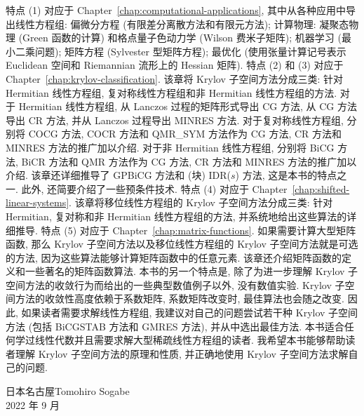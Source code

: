 {特点 (1) 对应于 Chapter~\ref{chap:computational-applications}, 其中从各种应用中导出线性方程组: 偏微分方程 (有限差分离散方法和有限元方法); 计算物理: 凝聚态物理 (Green 函数的计算) 和格点量子色动力学 (Wilson 费米子矩阵); 机器学习 (最小二乘问题); 矩阵方程 (Sylvester 型矩阵方程); 最优化 (使用张量计算记号表示 Euclidean 空间和 Riemannian 流形上的 Hessian 矩阵).}
{特点 (2) 和 (3) 对应于 Chapter~\ref{chap:krylov-classification}. 该章将 Krylov 子空间方法分成三类: 针对 Hermitian 线性方程组, 复对称线性方程组和非 Hermitian 线性方程组的方法. 对于 Hermitian 线性方程组, 从 Lanczos 过程的矩阵形式导出 CG 方法, 从 CG 方法导出 CR 方法, 并从 Lanczos 过程导出 MINRES 方法. 对于复对称线性方程组, 分别将 COCG 方法, COCR 方法和 QMR\_SYM 方法作为 CG 方法, CR 方法和 MINRES 方法的推广加以介绍. 对于非 Hermitian 线性方程组, 分别将 BiCG 方法, BiCR 方法和 QMR 方法作为 CG 方法, CR 方法和 MINRES 方法的推广加以介绍. 该章还详细推导了 GPBiCG 方法和 (块) IDR($s$) 方法, 这是本书的特点之一. 此外, 还简要介绍了一些预条件技术.}
{特点 (4) 对应于 Chapter~\ref{chap:shifted-linear-systems}. 该章将移位线性方程组的 Krylov 子空间方法分成三类: 针对 Hermitian, 复对称和非 Hermitian 线性方程组的方法, 并系统地给出这些算法的详细推导.}
{特点 (5) 对应于 Chapter~\ref{chap:matrix-functions}. 如果需要计算大型矩阵函数, 那么 Krylov 子空间方法以及移位线性方程组的 Krylov 子空间方法就是可选的方法, 因为这些算法能够计算矩阵函数中的任意元素. 该章还介绍矩阵函数的定义和一些著名的矩阵函数算法.}
{本书的另一个特点是, 除了为进一步理解 Krylov 子空间方法的收敛行为而给出的一些典型数值例子以外, 没有数值实验. Krylov 子空间方法的收敛性高度依赖于系数矩阵, 系数矩阵改变时, 最佳算法也会随之改变. 因此, 如果读者需要求解线性方程组, 我建议对自己的问题尝试若干种 Krylov 子空间方法 (包括 BiCGSTAB 方法和 GMRES 方法), 并从中选出最佳方法.}
{本书适合任何学过线性代数并且需要求解大型稀疏线性方程组的读者. 我希望本书能够帮助读者理解 Krylov 子空间方法的原理和性质, 并正确地使用 Krylov 子空间方法求解自己的问题.}
\begin{flushright}
{日本名古屋}\qquad Tomohiro Sogabe\\
{2022 年 9 月}
\end{flushright}
